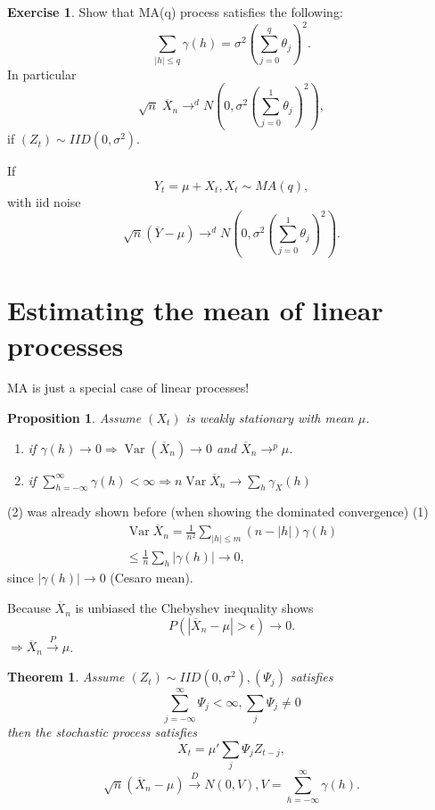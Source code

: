 \documentclass[12pt,a4paper, notitlepage]{book}
\theoremstyle{definition} %
\newtheorem{exercise}{Exercise}[chapter]
\theoremstyle{plain} %
\newtheorem{theorem}{Theorem}
\newtheorem{proposition}[justCounting]{Proposition}
\DeclareMathOperator{\Var}{Var}
\begin{document}
\begin{exercise}
Show that MA(q) process satisfies the following:
\[ \sum_{|h| \leq q} \gamma(h) = \sigma^2(\sum_{j = 0}^q \theta_j)^2 . \]
 In particular
\[ \sqrt{n } \; \overline{X}_n \rightarrow^d N(0, \sigma^2(\sum_{j=0}^1 \theta_j)^2), \]  
if $(Z_t) \sim IID(0, \sigma^2)$.

If 
\[ Y_t = \mu + X_t, X_t \sim MA(q) , \]
 with iid noise 
\[ \sqrt{n}(\overline{Y} - \mu) \rightarrow^d N(0, \sigma^2(\sum_{j=0}^1 \theta_j)^2). \]
\end{exercise}

\section{Estimating the mean of linear processes}

MA is just a special case of linear processes! 

\begin{proposition}
Assume $(X_t)$ is weakly stationary with mean $\mu$.
\begin{enumerate}
\item if $\gamma(h) \rightarrow 0 \Rightarrow \Var(\overline{X}_n) \rightarrow 0$ and $\overline{X}_n \rightarrow^p \mu$.
\item if $\sum_{h = -\infty}^\infty\gamma(h) < \infty \Rightarrow n \Var \overline{X}_n \rightarrow \sum_h \gamma_X(h)$
\end{enumerate}
\end{proposition}
\proof
(2) was already shown before (when showing the dominated convergence)
(1)  
\begin{align*} \Var \overline{X}_n = \frac{1}{n^2} \sum_{|h| \leq m} (n - |h|)\gamma(h) \\ 
\leq \frac{1}{n} \sum_h |\gamma(h)| \rightarrow 0, \end{align*}
 since $|\gamma(h)| \rightarrow 0$ (Cesaro mean). 

Because $\overline{X}_n$ is unbiased the Chebyshev inequality shows 
\[ P(|\overline{X}_n - \mu| > \epsilon) \rightarrow 0 . \]
$\Rightarrow \overline{X}_n \overset{P}{\rightarrow} \mu$.
\endproof

\begin{theorem}
Assume $(Z_t) \sim IID(0, \sigma^2), (\Psi_j)$ satisfies 
\[ \sum_{j = -\infty}^\infty \Psi_j< \infty, \sum_j \Psi_j \neq 0 \]
 then the stochastic process satisfies 
\[ X_t = \mu ' \sum_j \Psi_j Z_{t-j} , \]
\[ \sqrt{n}(\overline{X}_n - \mu) \overset{D}{\rightarrow} N(0, V), V = \sum_{h=-\infty}^\infty \gamma(h). \]
\end{theorem}
\end{document}
